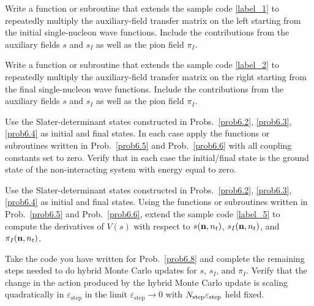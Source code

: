 \begin{prob}
\label{prob6.5}
Write a function or subroutine that extends the sample code \ref{label_1}  to repeatedly multiply the auxiliary-field transfer matrix on the left starting from the initial single-nucleon wave functions.  Include the contributions from the auxiliary fields $s$ and $s_I$ as well as the pion
 field $\pi_I$.  
\end{prob}

\begin{prob}
\label{prob6.6}
Write a function or subroutine that extends the sample code \ref{label_2}  to
repeatedly multiply the auxiliary-field transfer matrix on the right starting from the final
single-nucleon wave functions.  Include the contributions from the auxiliary
fields $s$ and $s_I$ as well as the pion
 field $\pi_I$.  
\end{prob}

\begin{prob}
\label{prob6.7}
Use the Slater-determinant states constructed in Probs.~\ref{prob6.2}, \ref{prob6.3}, \ref{prob6.4} as initial and final states.  In each case apply the functions or subroutines written in Prob.~\ref{prob6.5} and Prob.~\ref{prob6.6} with all coupling constants set to zero.  Verify that in each case the initial/final state is the ground state of the non-interacting system with energy equal to zero.
\end{prob}

\begin{prob}
\label{prob6.8}
Use the Slater-determinant states constructed in Probs.~\ref{prob6.2}, \ref{prob6.3},
\ref{prob6.4} as initial and final states.  Using the functions or subroutines written in Prob.~\ref{prob6.5} and Prob.~\ref{prob6.6}, extend the sample code  \ref{label_5} to compute the derivatives of $V(s)$ with respect to $s({\bf n},n_t)$, $s_I({\bf n},n_t)$, and $\pi_I({\bf n},n_t)$.
\end{prob}

\begin{prob}
\label{prob6.9}
Take the code you have written for Prob.~\ref{prob6.8} and complete the remaining steps needed to do hybrid Monte Carlo updates for $s$, $s_I$, and $\pi_I$. Verify that the change in the action produced by the hybrid Monte Carlo update
is scaling quadratically in $\varepsilon_{\mathrm{step}}$ in the limit
$\varepsilon_{\mathrm{step}} \rightarrow 0$ with $N_{\rm step}\varepsilon_{\mathrm{step}}$
held fixed.
\end{prob}   

